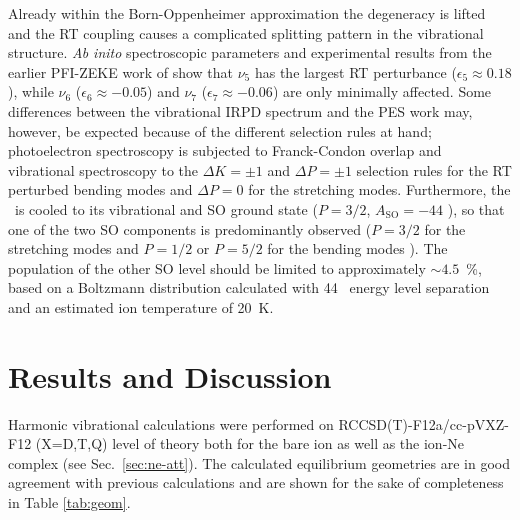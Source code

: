 Already within the Born-Oppenheimer approximation the degeneracy is lifted and the RT coupling causes a complicated splitting pattern in the vibrational structure.
\emph{Ab inito} spectroscopic parameters and experimental results from the earlier PFI-ZEKE work of \citet{Dai2015TheCalculations} show that $\nu_5$ has the largest RT perturbance ($\epsilon_5 \approx 0.18$), while $\nu_6$ ($\epsilon_6 \approx -0.05$) and $\nu_7$ ($\epsilon_7 \approx -0.06$) are only minimally affected. Some differences between the vibrational IRPD spectrum and the PES work may, however, be expected because of the different selection rules at hand; photoelectron spectroscopy is subjected to Franck-Condon overlap and vibrational spectroscopy to the $\Delta K = \pm 1 $ and $\Delta P = \pm 1 $ selection rules for the RT perturbed bending modes and $\Delta P = 0 $ for the stretching modes. Furthermore, the \ion\ is cooled to its vibrational and SO ground state ($P = 3/2$, $A_\mathrm{SO}=-44$  \wn ), so that one of the two SO components is predominantly observed ($P = 3/2$ for the stretching modes and $P = 1/2$ or $P = 5/2$ for the bending modes ). The population of the other SO level should be limited to approximately $\sim4.5$~\%, based on a Boltzmann distribution calculated with 44 \wn\ energy level separation and an estimated ion temperature of 20~K.     

\section{Results and Discussion}


Harmonic vibrational calculations were performed on RCCSD(T)-F12a/cc-pVXZ-F12 (X=D,T,Q) level of theory both for the bare ion as well as the ion-Ne complex (see Sec.~\ref{sec:ne-att}). 
The calculated equilibrium geometries are in good agreement with previous calculations \cite{Dai2015TheCalculations,Desrier2016ExperimentalSpectroscopy, Leach2014IonizationCyanoacetylene} and are shown for the sake of completeness in Table \ref{tab:geom}.

